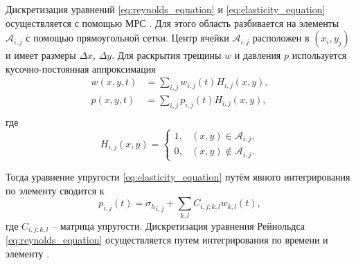 Дискретизация уравнений \eqref{eq:reynolds_equation} и \eqref{eq:elasticity_equation} осуществляется с помощью МРС \cite{dispalecement_discontinuty_Crouch1983}. Для этого область разбивается на элементы $\mathcal{A}_{i,j}$ с помощью прямоугольной сетки. Центр ячейки $\mathcal{A}_{i,j}$ расположен в $(x_i,y_j)$ и имеет размеры $\Delta x$, $\Delta y$. Для раскрытия трещины $w$ и давления $p$ используется кусочно-постоянная аппроксимация
\begin{equation}
    \label{eq:piecewiece_approximation}
    \begin{split}
        w(x,y,t) &= \sum\limits_{i,j} w_{i,j}(t) H_{i,j}(x,y), \\
        p(x,y,t) &= \sum\limits_{i,j} p_{i,j}(t) H_{i,j}(x,y), \\
    \end{split}
\end{equation}
где 
\begin{equation}
    \label{eq:heaviside_function}
    H_{i,j}(x,y) = \left\{
        \begin{array}{ll}
            1, & (x,y) \in \mathcal{A}_{i,j}, \\
            0, & (x,y) \notin \mathcal{A}_{i,j}.
        \end{array}\right.
\end{equation}

Тогда уравнение упругости \eqref{eq:elasticity_equation} путём явного интегрирования по элементу сводится к
\begin{equation}
    \label{eq:discrete_elasticity}
    p_{i,j}(t) = {\sigma_h}_{i,j} + \sum\limits_{k,l} C_{i,j;k,l} w_{k,l}(t),
\end{equation}
где $C_{i,j;k,l}$ -- матрица упругости. Дискретизация уравнения Рейнольдса \eqref{eq:reynolds_equation} осуществляется путем интегрирования по времени и элементу \cite{DONTSOV201753}.